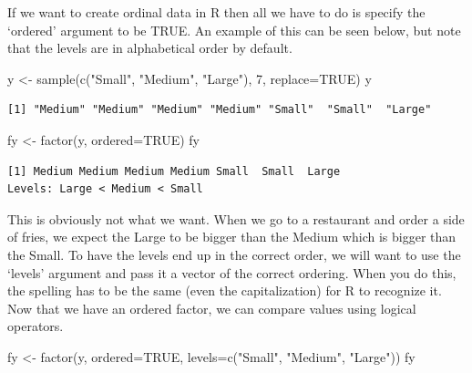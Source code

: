 \documentclass[
  letterpaper,
  DIV=11,
  numbers=noendperiod]{scrreprt}
\newenvironment{Shaded}{\begin{snugshade}}{\end{snugshade}}
\newcommand{\AttributeTok}[1]{\textcolor[rgb]{0.40,0.45,0.13}{#1}}
\newcommand{\ConstantTok}[1]{\textcolor[rgb]{0.56,0.35,0.01}{#1}}
\newcommand{\DecValTok}[1]{\textcolor[rgb]{0.68,0.00,0.00}{#1}}
\newcommand{\FunctionTok}[1]{\textcolor[rgb]{0.28,0.35,0.67}{#1}}
\newcommand{\NormalTok}[1]{\textcolor[rgb]{0.00,0.23,0.31}{#1}}
\newcommand{\OtherTok}[1]{\textcolor[rgb]{0.00,0.23,0.31}{#1}}
\newcommand{\StringTok}[1]{\textcolor[rgb]{0.13,0.47,0.30}{#1}}
\begin{document}
If we want to create ordinal data in R then all we have to do is specify
the `ordered' argument to be TRUE. An example of this can be seen below,
but note that the levels are in alphabetical order by default.

\begin{Shaded}
\begin{Highlighting}[]
\NormalTok{y }\OtherTok{\textless{}{-}} \FunctionTok{sample}\NormalTok{(}\FunctionTok{c}\NormalTok{(}\StringTok{"Small"}\NormalTok{, }\StringTok{"Medium"}\NormalTok{, }\StringTok{"Large"}\NormalTok{), }\DecValTok{7}\NormalTok{, }\AttributeTok{replace=}\ConstantTok{TRUE}\NormalTok{)}
\NormalTok{y}
\end{Highlighting}
\end{Shaded}

\begin{verbatim}
[1] "Medium" "Medium" "Medium" "Medium" "Small"  "Small"  "Large" 
\end{verbatim}

\begin{Shaded}
\begin{Highlighting}[]
\NormalTok{fy }\OtherTok{\textless{}{-}} \FunctionTok{factor}\NormalTok{(y, }\AttributeTok{ordered=}\ConstantTok{TRUE}\NormalTok{)}
\NormalTok{fy}
\end{Highlighting}
\end{Shaded}

\begin{verbatim}
[1] Medium Medium Medium Medium Small  Small  Large 
Levels: Large < Medium < Small
\end{verbatim}

This is obviously not what we want. When we go to a restaurant and order
a side of fries, we expect the Large to be bigger than the Medium which
is bigger than the Small. To have the levels end up in the correct
order, we will want to use the `levels' argument and pass it a vector of
the correct ordering. When you do this, the spelling has to be the same
(even the capitalization) for R to recognize it. Now that we have an
ordered factor, we can compare values using logical operators.

\begin{Shaded}
\begin{Highlighting}[]
\NormalTok{fy }\OtherTok{\textless{}{-}} \FunctionTok{factor}\NormalTok{(y, }\AttributeTok{ordered=}\ConstantTok{TRUE}\NormalTok{, }\AttributeTok{levels=}\FunctionTok{c}\NormalTok{(}\StringTok{"Small"}\NormalTok{, }\StringTok{"Medium"}\NormalTok{, }\StringTok{"Large"}\NormalTok{))}
\NormalTok{fy}
\end{Highlighting}
\end{Shaded}
\end{document}
